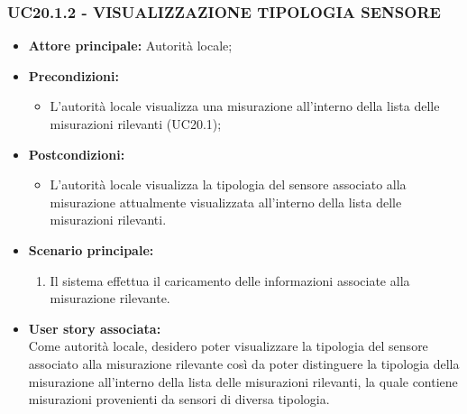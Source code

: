 \subsubsection{UC20.1.2 - VISUALIZZAZIONE TIPOLOGIA SENSORE}
\begin{itemize}
    \item \textbf{Attore principale:} Autorità locale;
    \item \textbf{Precondizioni:}
        \begin{itemize}
                \item L'autorità locale visualizza una misurazione all'interno della lista delle misurazioni rilevanti (UC20.1);
        \end{itemize}
    \item \textbf{Postcondizioni:}
        \begin{itemize}
            \item L'autorità locale visualizza la tipologia del sensore associato alla misurazione attualmente visualizzata all'interno della lista delle misurazioni rilevanti.
        \end{itemize}
    \item \textbf{Scenario principale:}
        \begin{enumerate}
            \item Il sistema effettua il caricamento delle informazioni associate alla misurazione rilevante.
        \end{enumerate}
    \item \textbf{User story associata:} \\
    Come autorità locale, desidero poter visualizzare la tipologia del sensore associato alla misurazione rilevante così da poter distinguere la tipologia della misurazione all'interno della lista delle misurazioni rilevanti, la quale contiene misurazioni provenienti da sensori di diversa tipologia.
\end{itemize}